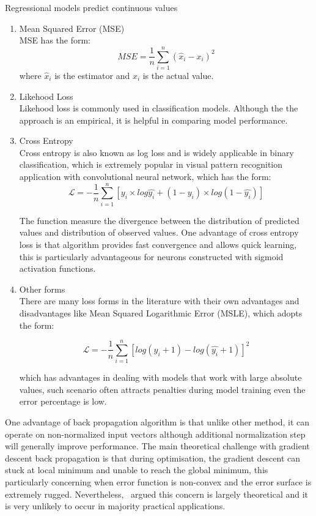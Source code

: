 Regressional models predict continuous values
\begin{enumerate}
    \item Mean Squared Error (MSE) \\
MSE has the form:
\begin{equation}
    MSE = \frac{1}{n}\sum_{i=1}^n (\hat{x}_i - x_i)^2
\end{equation}
where $\hat{x}_i$ is the estimator and $x_i$ is the actual value. 
    \item Likehood Loss \\
Likehood loss is commonly used in classification models. Although the the approach is an empirical, it is helpful in comparing model performance. 
    \item Cross Entropy \\
Cross entropy is also known as log loss and is widely applicable in binary classification, which is extremely popular in visual pattern recognition application with convolutional neural network, which has the form:
\begin{equation}
    \mathcal{L} = -\frac{1}{n}\sum_{i=1}^n [y_i \times log\hat{y_i} +(1-y_i) \times log(1-\hat{y_i}) ] 
\end{equation}

The function measure the divergence between the distribution of predicted values and distribution of observed values. One advantage of cross entropy loss is that algorithm provides fast convergence and allows quick learning, this is particularly advantageous for neurons constructed with sigmoid activation functions. 
    \item Other forms\\
There are many loss forms in the literature with their own advantages and disadvantages like Mean Squared Logarithmic Error (MSLE), which adopts the form:

\begin{equation}
    \mathcal{L} = -\frac{1}{n}\sum_{i=1}^n [log (y_i + 1) -  log(\hat{y_i} + 1) ]^2 
\end{equation}

which has advantages in dealing with models that work with large absolute values, such scenario often attracts penalties during model training even the error percentage is low. 
\end{enumerate}

\par 
One advantage of back propagation algorithm is that unlike other method, it can operate on non-normalized input vectors although additional normalization step will generally improve performance. \cite{Buckland:2002} The main theoretical challenge with gradient descent back propagation is that during optimisation, the gradient descent can stuck at local minimum and unable to reach the global minimum, this particularly concerning when error function is non-convex and the error surface is extremely rugged. Nevertheless,~\citet{LeCun_2015} argued this concern is largely theoretical and it is very unlikely to occur in majority practical applications. 